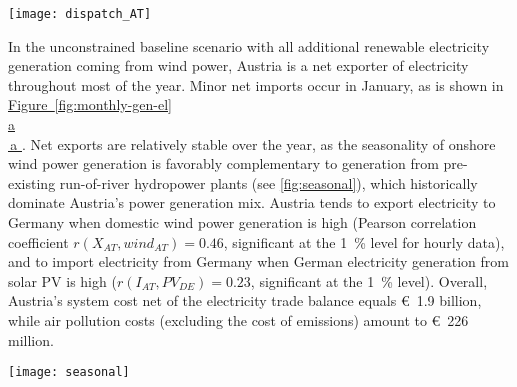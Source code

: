 \documentclass[review, 3p, times, 12pt, authoryear]{elsarticle}
\newcommand*{\figref}[2][]{%
    \hyperref[{fig:#2}]{%
        Figure~\ref*{fig:#2}%
        \ifx\\#1\\%
        \else
        \,#1%
        \fi
    }%
}
\begin{document}
    \begin{figure*}[h!t]
        \centering
        \texttt{[image: dispatch\_AT]}
        \caption{Monthly electricity generation in Austria by source (2030) for (a) maximum wind power and (b) maximum solar power}
        \label{fig:monthly-gen-el}
    \end{figure*}

    In the unconstrained baseline scenario with all additional renewable electricity generation coming from wind power, Austria is a net exporter of electricity throughout most of the year.
    Minor net imports occur in January, as is shown in \figref[a]{monthly-gen-el}.
    Net exports are relatively stable over the year, as the seasonality of onshore wind power generation is favorably complementary to generation from pre-existing run-of-river hydropower plants (see \autoref{fig:seasonal}), which historically dominate Austria's power generation mix.
    Austria tends to export electricity to Germany when domestic wind power generation is high (Pearson correlation coefficient $r(X_{AT},wind_{AT})=0.46$, significant at the \SI{1}{\percent} level for hourly data), and to import electricity from Germany when German electricity generation from solar PV is high ($r(I_{AT},PV_{DE})=0.23$, significant at the \SI{1}{\percent} level).
    Overall, Austria's system cost net of the electricity trade balance equals \SI{1.9}[\euro]{} billion, while air pollution costs (excluding the cost of  emissions) amount to \SI{226}[\euro]{} million.

    \begin{figure*}[ht]
        \centering
        \texttt{[image: seasonal]}
        \caption{Seasonal pattern of electricity generation from intermittent sources and electricity consumption (monthly average relative to annual average) in Austria in 2016}
        \label{fig:seasonal}
    \end{figure*}
\end{document}
